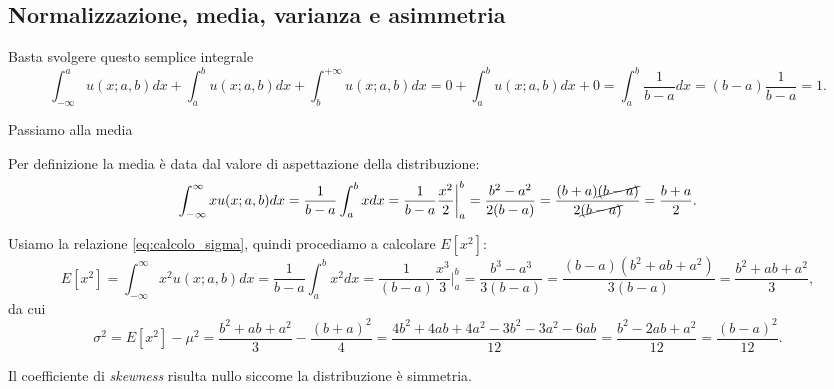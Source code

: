 \documentclass{report}
\begin{document}
\subsection{Normalizzazione, media, varianza e asimmetria}
\begin{myproof}
	Basta svolgere questo semplice integrale
	$$
		\int_{-\infty}^{a} u(x;a,b)dx + \int_{a}^b u(x; a, b)dx + \int_b^{+\infty} u(x; a, b)dx = 0 + \int_a^b u(x; a, b)dx + 0 = \int_a^b \frac{1}{b-a}dx = (b-a) \frac{1}{b-a} = 1.
	$$
\end{myproof}
Passiamo alla media
\begin{myproof}
	Per definizione la media è data dal valore di aspettazione della distribuzione:
	$$
	\int_{-\infty}^{\infty} xu(x; a, b)dx = \frac{1}{b-a} \int_{a}^b xdx = \frac{1}{b-a} \frac{x^2}{2}\bigg|^b_a = \frac{b^2 - a^2}{2(b-a)} = \frac{(b+a)\cancel{(b-a)}}{2\cancel{(b-a)}} = \frac{b+a}{2}.
	$$
\end{myproof}
\begin{myproof}
	Usiamo la relazione \ref{eq:calcolo_sigma}, quindi procediamo a calcolare $E[x^2]$:
	$$
		E[x^2] = \int_{-\infty}^{\infty} x^2 u(x; a, b)dx = \frac{1}{b-a} \int_a^b x^2 dx = \frac{1}{(b-a)}\frac{x^3}{3}\bigg|^b_a = \frac{b^3 - a^3}{3(b-a)} = \frac{(b-a)(b^2 + ab + a^2)}{3(b-a)} = \frac{b^2 + ab + a^2}{3},
	$$
	da cui
	$$
	\sigma^2 = E[x^2] - \mu^2 = \frac{b^2 + ab + a^2}{3} - \frac{(b+a)^2}{4} = \frac{4b^2 + 4ab + 4a^2 - 3b^2 - 3a^2 - 6ab}{12} = \frac{b^2 - 2ab + a^2}{12} = \frac{(b-a)^2}{12}.
	$$
\end{myproof}
Il coefficiente di \emph{skewness} risulta nullo siccome la distribuzione è simmetria.
\end{document}
